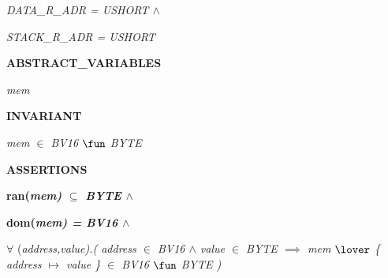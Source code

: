 \hspace*{0.20in}\it DATA\_R\_ADR \rm = \it USHORT  $\land$ 

\hspace*{0.20in}\it STACK\_R\_ADR \rm = \it USHORT 

\hspace*{0.20in}

\hspace*{0.20in} 

\hspace*{0.20in}

\hspace*{0.20in}

\bf ABSTRACT\_VARIABLES

\hspace*{0.20in}

\hspace*{0.20in}\it mem

\hspace*{0.20in}

\bf INVARIANT

\hspace*{0.20in}

\hspace*{0.20in}\it mem  $\in$  \it BV16  $\fun$  \it BYTE 

\hspace*{0.20in}

\hspace*{0.20in}

\bf ASSERTIONS

\hspace*{0.20in}

\hspace*{0.20in}\bf ran\rm (\it mem\rm )  $\subseteq$  \it BYTE  $\land$ 

\hspace*{0.20in}\bf dom\rm (\it mem\rm ) \rm = \it BV16  $\land$ 

\hspace*{0.20in} $\forall$ \rm (\it address\rm ,\it value\rm )\rm .\rm ( \it address  $\in$  \it BV16  $\land$  \it value  $\in$  \it BYTE  $\implies$ \hspace*{0.20in}\it mem  $\lover$  \rm \{ \it address  $\mapsto$  \it value \rm \}  $\in$  \it BV16  $\fun$  \it BYTE \rm ) 

\hspace*{0.20in}

\hspace*{0.20in} 

\hspace*{0.20in}

